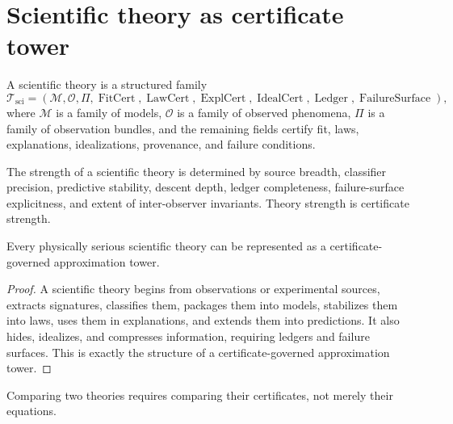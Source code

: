 \section{Scientific theory as certificate tower}
\label{sec:scientific-theory-certificate-tower}

\begin{definition}
\label{def:scientific-theory}
A scientific theory is a structured family
$$
\mathcal T_{\mathrm{sci}}
=
(\mathcal M,
\mathcal O,
\Pi,
\operatorname{FitCert},
\operatorname{LawCert},
\operatorname{ExplCert},
\operatorname{IdealCert},
\operatorname{Ledger},
\operatorname{FailureSurface}),
$$
where $\mathcal M$ is a family of models, $\mathcal O$ is a family of observed phenomena, $\Pi$ is a family of observation bundles, and the remaining fields certify fit, laws, explanations, idealizations, provenance, and failure conditions.
\end{definition}

\begin{definition}
\label{def:theory-strength}
The strength of a scientific theory is determined by source breadth, classifier precision, predictive stability, descent depth, ledger completeness, failure-surface explicitness, and extent of inter-observer invariants. Theory strength is certificate strength.
\end{definition}

\begin{theorem}
\label{thm:scientific-theories-certificate-governed-towers}
Every physically serious scientific theory can be represented as a certificate-governed approximation tower.
\end{theorem}

\begin{proof}
A scientific theory begins from observations or experimental sources, extracts signatures, classifies them, packages them into models, stabilizes them into laws, uses them in explanations, and extends them into predictions. It also hides, idealizes, and compresses information, requiring ledgers and failure surfaces. This is exactly the structure of a certificate-governed approximation tower.
\end{proof}

\begin{corollary}
\label{cor:theory-comparison-certificate-comparison}
Comparing two theories requires comparing their certificates, not merely their equations.
\end{corollary}

